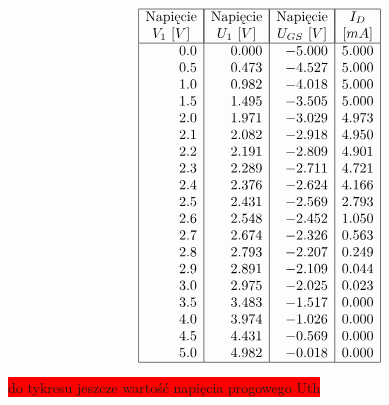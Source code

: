 \documentclass[polish,polish,a4paper]{article}
\begin{document}
	\begin{figure}[H]
	\begin{spacing}{1.3}
		\begin{equation*}
		\begin{array}{|r|r|r|r|}
		\hline
		\multicolumn{1}{|c|}{ $Napięcie$}&\multicolumn{1}{|c|}{ $Napięcie$}&\multicolumn{1}{|c|}{ $Napięcie$}&\multicolumn{1}{|c|}{I_{D}}\\
		\multicolumn{1}{|c|}{  V_{1}$ $[V]}&\multicolumn{1}{|c|}{ U_{1}$ $[V]}&\multicolumn{1}{|c|}{ U_{GS}$ $[V]}&\multicolumn{1}{|c|}{[mA]}\\\hline
0.0&0.000&-5.000&5.000\\
0.5&0.473&-4.527&5.000\\
1.0&0.982&-4.018&5.000\\
1.5&1.495&-3.505&5.000\\
2.0&1.971&-3.029&4.973\\
2.1&2.082&-2.918&4.950\\
2.2&2.191&-2.809&4.901\\
2.3&2.289&-2.711&4.721\\
2.4&2.376&-2.624&4.166\\
2.5&2.431&-2.569&2.793\\
2.6&2.548&-2.452&1.050\\
2.7&2.674&-2.326&0.563\\
2.8&2.793&-2.207&0.249\\
2.9&2.891&-2.109&0.044\\
3.0&2.975&-2.025&0.023\\
3.5&3.483&-1.517&0.000\\
4.0&3.974&-1.026&0.000\\
4.5&4.431&-0.569&0.000\\
5.0&4.982&-0.018&0.000\\
\hline
		\end{array}
		\end{equation*}
	\end{spacing}
\end{figure}

{\LARGE \colorbox{red}{do tykresu jeszcze wartość napięcia progowego Uth}}  
\end{document}
